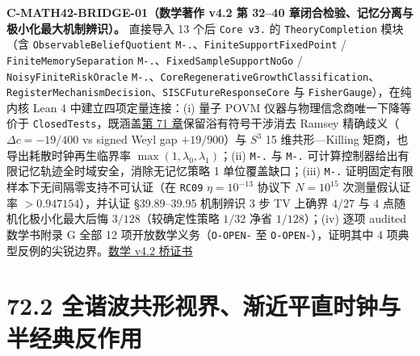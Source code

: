 \documentclass[
  11pt,
  oneside]{book}
\begin{document}
\protect\hypertarget{c-math42-bridge-01}{}{}

\textbf{C-MATH42-BRIDGE-01（数学著作 v4.2 第 32--40
章闭合检验、记忆分离与极小化最大机制辨识）。} 直接导入 13 个后
\texttt{Core\ v3.} 的 \texttt{Theory\allowbreak Completion} 模块（含
\texttt{Observable\allowbreak Belief\allowbreak Quotient}
\texttt{M-.}、\allowbreak \texttt{Finite\allowbreak Support\allowbreak Fixed\allowbreak Point} /
\texttt{Finite\allowbreak Memory\allowbreak Separation}
\texttt{M-.}、\allowbreak \texttt{Fixed\allowbreak Sample\allowbreak Support\allowbreak No\allowbreak Go} /
\texttt{Noisy\allowbreak Finite\allowbreak Risk\allowbreak Oracle}
\texttt{M-.}、\allowbreak \texttt{Core\allowbreak Regenerative\allowbreak Growth\allowbreak Classification}、\allowbreak \texttt{Register\allowbreak Mechanism\allowbreak Decision}、\allowbreak \texttt{SISCFuture\allowbreak Response\allowbreak Core}
与 \texttt{Fisher\allowbreak Gauge}），在纯内核 Lean 4 中建立四项定量连接：(i) 量子
POVM 仪器与物理信念商唯一下降等价于
\texttt{Closed\allowbreak Tests}，既涵盖\protect\hyperlink{ch-71}{第 71
章}保留浴有符号干涉消去 Ramsey 精确歧义（\(\Delta c = -19/400\) vs
signed Weyl gap \(+19/900\)）与 \(S^3\) 15 维共形---Killing
矩商，也导出耗散时钟再生临界率 \(\max(1, \lambda_0, \lambda_1)\)；(ii)
\texttt{M-.} 与 \texttt{M-.}
可计算控制器给出有限记忆轨迹全时域安全，消除无记忆策略 1
单位覆盖缺口；(iii) \texttt{M-.}
证明固定有限样本下无间隔零支持不可认证（在 \texttt{RC09}
\(\eta = 10^{-13}\) 协议下 \(N = 10^{15}\) 次测量假认证率
\(> 0.947154\)），并认证 §39.89--39.95 机制辨识 3 步 TV 上确界 \(4/27\)
与 4 点随机化极小化最大后悔 \(3/128\)（较确定性策略 \(1/32\) 净省
\(1/128\)）；(iv) 逐项 audited 数学书附录 G 全部 12
项开放数学义务（\texttt{O-\allowbreak OPEN-} 至 \texttt{O-\allowbreak OPEN-}），证明其中 4
项典型反例的尖锐边界。\href{../../unification/math_v42_closed_tests_bridge/certificate.json}{数学
v4.2 桥证书}

\section{72.2 全谐波共形视界、渐近平直时钟与半经典反作用}

\protect\hypertarget{p-horizon-clock-01}{}{}
\end{document}
